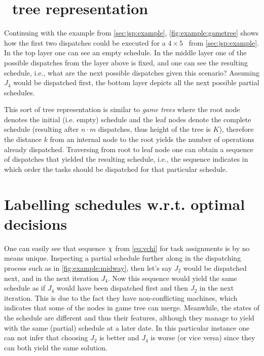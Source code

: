 \vspace*{-24pt}
\section{\Jsp\ tree representation}\label{sec:gen:gametree}
Continuing with the example from \cref{sec:jsp:example}, 
\cref{fig:example:gametree} shows how the first two dispatches could be 
executed for a $4\times5$ \jsp\ from \cref{sec:jsp:example}.
In the top layer one can see an empty schedule.
In the middle layer one of the possible dispatches from the layer above is 
fixed, and one can see the resulting schedule, i.e., what are the next possible 
dispatches given this scenario? Assuming $J_4$ would be dispatched first, the 
bottom layer depicts all the next possible partial schedules.

This sort of tree representation is similar to \emph{game trees} 
\citep[cf.][]{Rosen03} where the root node denotes the initial (i.e. empty) 
schedule and the leaf nodes denote the complete schedule (resulting after 
$n\cdot m$ dispatches, thus height of the tree is $K$), therefore the 
distance $k$ from an internal node to the root yields the number of operations 
already dispatched. Traversing from root to leaf node one can obtain a sequence 
of dispatches that yielded the resulting schedule, i.e., the sequence indicates 
in which order the tasks should be dispatched for that particular schedule. 

\section{Labelling schedules w.r.t. optimal decisions} 
One can easily see that sequence ${\mathbf{\chi}}$ from \cref{eq:vchi} for task 
assignments is by no means unique. 
Inspecting a partial schedule further along in the dispatching process such as 
in \cref{fig:example:midway}, then let's say $J_2$ would be dispatched next, 
and in the next iteration $J_4$. 
Now this sequence would yield the same schedule as if $J_4$ would have been 
dispatched first and then $J_2$ in the next iteration. 
This is due to the fact they have non-conflicting machines, which indicates 
that some of the nodes in game tree can merge. 
Meanwhile, the states of the schedule are different and thus their 
features, although they manage to yield with the same (partial) schedule at a 
later date.  %
In this particular instance one can not infer that choosing $J_2$ is better and 
$J_4$ is worse (or vice versa) since they can both yield the same solution.

